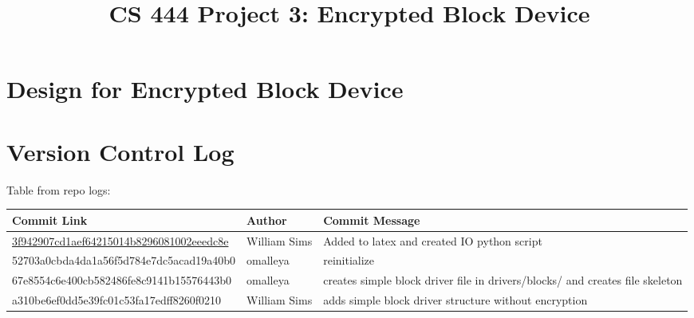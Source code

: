 \documentclass[10pt,letterpaper,draftclsnofoot,onecolumn]{IEEEtran}
\begin{document}

\begin{titlepage}
\title{CS 444 Project 3: Encrypted Block Device}
\author
{
}
    \maketitle
    \vspace{2cm}
    \begin{abstract}
        \noindent 
    \end{abstract}

\end{titlepage}

\section{Design for Encrypted Block Device}
\noindent{}

\section{Version Control Log}
\noindent Table from repo logs:

\begin{center}
    \begin{tabular}{ | p{8cm} | p{3cm} | p{6cm} |}
    \hline
    Commit Link & Author & Commit Message \\ \hline
    \href{https://github.com/omalleya/cs444-concurrency-writeups/commit/3f942907cd1aef64215014b8296081002eeedc8e}{3f942907cd1aef64215014b8296081002eeedc8e} & William Sims & Added to latex and created IO python script \\ \hline
    52703a0cbda4da1a56f5d784e7dc5acad19a40b0 & omalleya & reinitialize \\ \hline
    67e8554c6e400cb582486fe8c9141b15576443b0 & omalleya & creates simple block driver file in drivers/blocks/ and creates file skeleton \\ \hline
    a310be6ef0dd5e39fc01c53fa17edff8260f0210 & William Sims & adds simple block driver structure without encryption \\ \hline

    \end{tabular}
\end{center}
\end{document}
